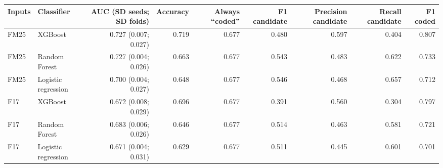 \begin{tabular}{llrrrrrrr}
\toprule
Inputs & Classifier & AUC (SD seeds; SD folds) & Accuracy & Always ``coded'' & F1 candidate & Precision candidate & Recall candidate & F1 coded \\
\midrule
FM25 & XGBoost & 0.727 (0.007; 0.027) & 0.719 & 0.677 & 0.480 & 0.597 & 0.404 & 0.807 \\
FM25 & Random Forest & 0.727 (0.004; 0.026) & 0.663 & 0.677 & 0.543 & 0.483 & 0.622 & 0.733 \\
FM25 & Logistic regression & 0.700 (0.004; 0.027) & 0.648 & 0.677 & 0.546 & 0.468 & 0.657 & 0.712 \\
F17 & XGBoost & 0.672 (0.008; 0.029) & 0.696 & 0.677 & 0.391 & 0.560 & 0.304 & 0.797 \\
F17 & Random Forest & 0.683 (0.006; 0.026) & 0.646 & 0.677 & 0.514 & 0.463 & 0.581 & 0.721 \\
F17 & Logistic regression & 0.671 (0.004; 0.031) & 0.629 & 0.677 & 0.511 & 0.445 & 0.601 & 0.701 \\
\bottomrule
\end{tabular}
